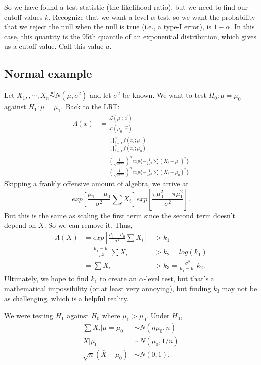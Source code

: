 \documentclass[titlepage, 12pt, leqno]{article}
\begin{document}
So we have found a test statistic (the likelihood ratio), but we need to find
our cutoff values $k$. Recognize that we want a level-$\alpha$ test, so we want
the probability that we reject the null when the null is true (i.e., a
type-I error), is $1-\alpha$. In this case, this quantity is the 95th quantile
of an exponential distribution, which gives us a cutoff value. Call this value
$a$.

\subsection{Normal example}
Let $X_{1},, \cdots ,X_{n} \overset{\mathrm{iid}}{\sim}N(\mu, \sigma^{2})$ and
let $\sigma^{2}$ be known. We want to test $H_{0}:\mu = \mu_{0}$ against
$H_{1}:\mu = \mu_{1}$. Back to the LRT:
\begin{align*}
    \Lambda(x)
    &= \frac{\mathcal{L}(\mu_{1};\vec x)}{\mathcal{L}(\mu_{0};\vec x)} \\
    &= \frac{ \prod_{i=1}^{n}f(x_{i};\mu_{1})}{ 
    \prod_{i=1}^{n}f(x_{i};\mu_{0})} \\
    &= \frac{\left(\frac{1}{\sqrt{2\pi\sigma^{2}}}\right)^{n}
    exp\{-\frac{1}{2\sigma^{2}}\sum (X_{i}-\mu_{1})^{2}\}}{
    \left(\frac{1}{\sqrt{2\pi\sigma^{2}}}\right)^{n}
    exp\{-\frac{1}{2\sigma^{2}}\sum (X_{i}-\mu_{0})^{2}\}}
\end{align*}
Skipping a frankly offensive amount of algebra, we arrive at
\[
    exp\left[\frac{\mu_{1}-\mu_{0}}{\sigma^{2}} \sum X_{i}\right]exp
    \left[\frac{\pi\mu_{0}^{2}-\pi\mu_{1}^{2}}{\sigma^{2}}\right].
\]
But this is the same as scaling the first term since the second term doesn't
depend on $X$. So we can remove it. Thus,
\begin{align*}
    \Lambda(X)
    &= exp\left[\frac{\mu_{1} - \mu_{0}}{\sigma^{2}}\sum X_{i}\right] &> k_{1}\\
    &= \frac{\mu_{1} - \mu_{0}}{\sigma^{2}}\sum X_{i} & >k_{2} = log(k_{1}) \\
    &= \sum X_{i} & > k_{3} = \frac{\sigma^{2}}{\mu_{1} - \mu_{0}}k_{2}.
\end{align*}
Ultimately, we hope to find $k_{1}$ to create an $\alpha$-level test, but 
that's a mathematical impossibility (or at least very annoying), but finding
$k_{3}$ may not be as challenging, which is a helpful reality.

We were testing $H_{1}$ against $H_{0}$ where $\mu_{1} > \mu_{0}$. Under
$H_{0}$,
\begin{align*}
    \sum X_{i} | \mu = \mu_{0}
    & \sim N(n\mu_{0}, n) \\
    \bar X | \mu_{0} & \sim N(\mu_{0}, 1/n) \\
    \sqrt{n}(\bar X - \mu_{0}) & \sim N(0,1).
\end{align*}
\end{document}
